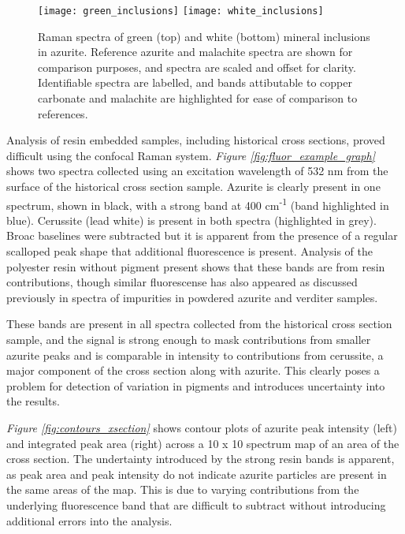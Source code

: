 \begin{figure}[H]
\centering
\begin{minipage}[t]{\linewidth}
  \centering
  \texttt{[image: green\_inclusions]}
\hfill
\texttt{[image: white\_inclusions]}
\hfill
\end{minipage}
\caption[Raman spectra of green and white mineral inclusions in azurite.]{Raman spectra of green (top) and white (bottom) mineral inclusions in azurite. Reference azurite and malachite spectra are shown for comparison purposes, and spectra are scaled and offset for clarity. Identifiable spectra are labelled, and bands attibutable to copper carbonate and malachite are highlighted for ease of comparison to references.}
\label{fig:label_raman}
\end{figure}

Analysis of resin embedded samples, including historical cross sections, proved difficult using the confocal Raman system. \textit{Figure \ref{fig:fluor_example_graph}} shows two spectra collected using an excitation wavelength of 532 nm from the surface of the historical cross section sample. Azurite is clearly present in one spectrum, shown in black, with a strong band at 400 cm\textsuperscript{-1} (band highlighted in blue). Cerussite (lead white) is present in both spectra (highlighted in grey). Broac baselines were subtracted but it is apparent from the presence of a regular scalloped peak shape that additional fluorescence is present. Analysis of the polyester resin without pigment present shows that these bands are from resin contributions, though similar fluorescense has also appeared as discussed previously in spectra of impurities in powdered azurite and verditer samples. 

These bands are present in all spectra collected from the historical cross section sample, and the signal is strong enough to mask contributions from smaller azurite peaks and is comparable in intensity to contributions from cerussite, a major component of the cross section along with azurite. This clearly poses a problem for detection of variation in pigments and introduces uncertainty into the results.

\textit{Figure \ref{fig:contours_xsection}} shows contour plots of azurite peak intensity (left) and integrated peak area (right) across a 10 x 10 spectrum map of an area of the cross section. The undertainty introduced by the strong resin bands is apparent, as peak area and peak intensity do not indicate azurite particles are present in the same areas of the map. This is due to varying contributions from the underlying fluorescence band that are difficult to subtract without introducing additional errors into the analysis.

